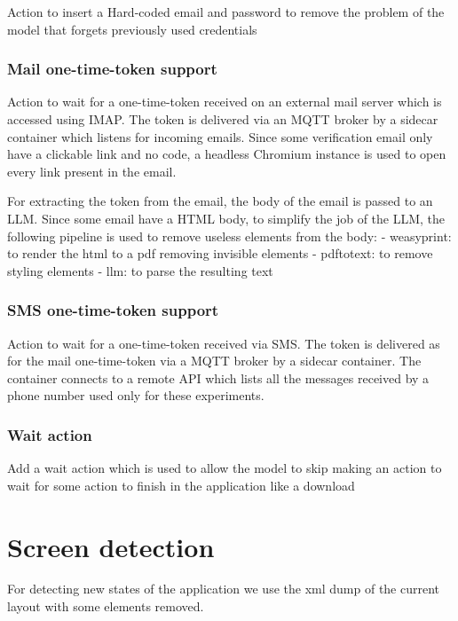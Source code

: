 Action to insert a Hard-coded email and password to remove the problem
of the model that forgets previously used credentials

\subsubsection{Mail one-time-token
support}\label{mail-one-time-token-support}

Action to wait for a one-time-token received on an external mail server
which is accessed using IMAP. The token is delivered via an MQTT broker
by a sidecar container which listens for incoming emails. Since some
verification email only have a clickable link and no code, a headless
Chromium instance is used to open every link present in the email.

For extracting the token from the email, the body of the email is passed
to an LLM. Since some email have a HTML body, to simplify the job of the
LLM, the following pipeline is used to remove useless elements from the
body: - weasyprint: to render the html to a pdf removing invisible
elements - pdftotext: to remove styling elements - llm: to parse the
resulting text

\subsubsection{SMS one-time-token
support}\label{sms-one-time-token-support}

Action to wait for a one-time-token received via SMS. The token is
delivered as for the mail one-time-token via a MQTT broker by a sidecar
container. The container connects to a remote API which lists all the
messages received by a phone number used only for these experiments.

\subsubsection{Wait action}\label{wait-action}

Add a wait action which is used to allow the model to skip making an
action to wait for some action to finish in the application like a
download

\section{Screen detection}\label{screen-detection}

For detecting new states of the application we use the xml dump of the
current layout with some elements removed.

